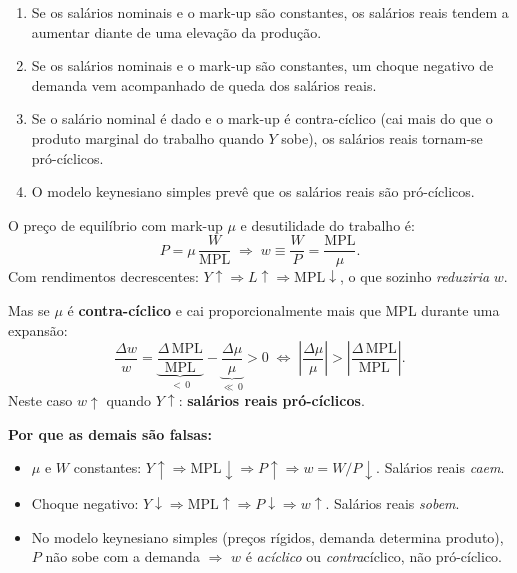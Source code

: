 \documentclass[12pt, a4paper]{article}
\begin{document}
\begin{enumerate}[label=\alph*)]
\item Se os salários nominais e o mark-up são constantes, os salários reais tendem a aumentar diante de uma elevação da produção.
\item Se os salários nominais e o mark-up são constantes, um choque negativo de demanda vem acompanhado de queda dos salários reais.
\item Se o salário nominal é dado e o mark-up é contra-cíclico (cai mais do que o produto marginal do trabalho quando $Y$ sobe), os salários reais tornam-se pró-cíclicos.
\item O modelo keynesiano simples prevê que os salários reais são pró-cíclicos.
\end{enumerate}

\begin{correctbox}[title={Resposta correta: c)}]
O preço de equilíbrio com mark-up $\mu$ e desutilidade do trabalho é:
\[
P = \mu\,\frac{W}{\mathrm{MPL}} \;\Longrightarrow\; w \equiv \frac{W}{P} = \frac{\mathrm{MPL}}{\mu}.
\]
Com rendimentos decrescentes: $Y\uparrow \Rightarrow L\uparrow \Rightarrow \mathrm{MPL}\downarrow$,
o que sozinho \emph{reduziria} $w$.

Mas se $\mu$ é \textbf{contra-cíclico} e cai proporcionalmente mais que MPL durante uma expansão:
\[
\frac{\Delta w}{w} = \underbrace{\frac{\Delta\,\mathrm{MPL}}{\mathrm{MPL}}}_{<\,0}
  - \underbrace{\frac{\Delta\mu}{\mu}}_{\ll\,0} > 0
  \;\Longleftrightarrow\;
  \left|\frac{\Delta\mu}{\mu}\right| > \left|\frac{\Delta\,\mathrm{MPL}}{\mathrm{MPL}}\right|.
\]
Neste caso $w\uparrow$ quando $Y\uparrow$: \textbf{salários reais pró-cíclicos}. \checkmark

\textbf{Por que as demais são falsas:}
\begin{itemize}[leftmargin=*]
\item[a)] $\mu$ e $W$ constantes: $Y\uparrow \Rightarrow \mathrm{MPL}\downarrow \Rightarrow P\uparrow
  \Rightarrow w = W/P\downarrow$. Salários reais \emph{caem}.
\item[b)] Choque negativo: $Y\downarrow \Rightarrow \mathrm{MPL}\uparrow \Rightarrow P\downarrow
  \Rightarrow w\uparrow$. Salários reais \emph{sobem}.
\item[d)] No modelo keynesiano simples (preços rígidos, demanda determina produto),
$P$ não sobe com a demanda $\Rightarrow$ $w$ é \emph{acíclico} ou \emph{contra}cíclico,
não pró-cíclico.
\end{itemize}
\end{correctbox}
\end{document}
